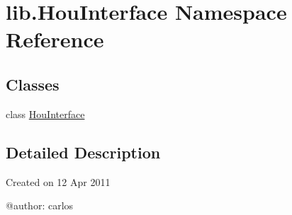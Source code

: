 \hypertarget{namespacelib_1_1_hou_interface}{\section{lib.\-Hou\-Interface Namespace Reference}
\label{namespacelib_1_1_hou_interface}
}
\subsection*{Classes}
\begin{DoxyCompactItemize}
\item 
class \hyperlink{classlib_1_1_hou_interface_1_1_hou_interface}{Hou\-Interface}
\end{DoxyCompactItemize}


\subsection{Detailed Description}
\begin{DoxyVerb}Created on 12 Apr 2011

@author: carlos
\end{DoxyVerb}
 